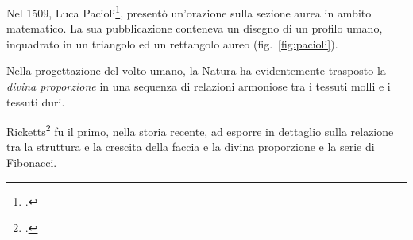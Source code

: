 Nel 1509, Luca Pacioli\footcite{Pacioli1509}, presentò un'orazione sulla sezione aurea in ambito matematico. La sua pubblicazione conteneva un disegno di un profilo umano, inquadrato in un triangolo ed un rettangolo aureo (fig.~\vref{fig:pacioli}).

Nella progettazione del volto umano, la Natura ha evidentemente trasposto la \textit{divina proporzione} in una sequenza di relazioni armoniose tra i tessuti molli e i tessuti duri. %

Ricketts\footcite{Ricketts1982,Ricketts1982a} fu il primo, nella storia recente, ad esporre in dettaglio sulla relazione tra la struttura e la crescita della faccia e la divina proporzione e la serie di Fibonacci.
